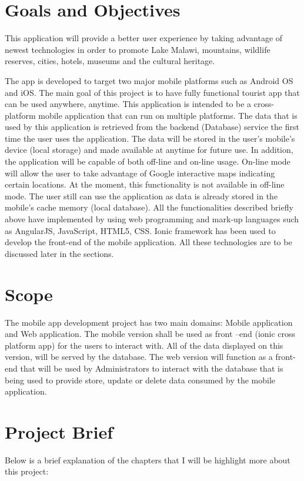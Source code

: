\section{Goals and Objectives}
This application will provide a better user experience by taking advantage of newest technologies in order to promote Lake Malawi, mountains, wildlife reserves, cities, hotels, museums and the cultural heritage.

The app is developed to target two major mobile platforms such as Android OS and iOS. The main goal of this project is to have fully functional tourist app that can be used anywhere, anytime.  This application is intended to be a cross-platform mobile application that can run on multiple platforms. The data that is used by this application is retrieved from the backend (Database) service the first time the user uses the application. The data will be stored in the user’s mobile’s device (local storage) and made available at anytime for future use. In addition, the application will be capable of both off-line and on-line usage. On-line mode will allow the user to take advantage of Google interactive maps indicating certain locations. At the moment, this functionality is not available in off-line mode. The user still can use the application as data is already stored in the mobile’s cache memory (local database). All the functionalities described briefly above have implemented by using web programming and mark-up languages such as AngularJS, JavaScript, HTML5, CSS. Ionic framework has been used to develop the front-end of the mobile application. All these technologies are to be discussed later in the sections.

\section{Scope}
The mobile app development project has two main domains: Mobile application and Web application. The mobile version shall be used as front –end (ionic cross platform app) for the users to interact with. All of the data displayed on this version, will be served by the database. The web version will function as a front-end that will be used by Administrators to interact with the database that is being used to provide store, update or delete data consumed by the mobile application. 

\section{Project Brief}
Below is a brief explanation of the chapters that I will be highlight more about this project:

